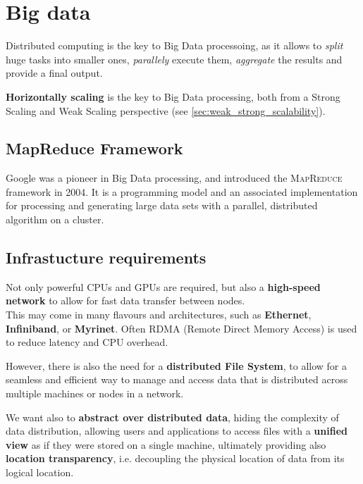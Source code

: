 \chapter{Big data}
\label{chap:big_data}

Distributed computing is the key to Big Data processoing, as it allows to \textit{split} huge tasks into smaller ones, \textit{parallely} execute them, \textit{aggregate} the results and provide a final output.

\textbf{Horizontally scaling} is the key to Big Data processing, both from a Strong Scaling and Weak Scaling perspective (see \autoref{sec:weak_strong_scalability}).

\section{MapReduce Framework}
Google was a pioneer in Big Data processing, and introduced the \textsc{MapReduce} framework in 2004.
It is a programming model and an associated implementation for processing and generating large data sets with a parallel, distributed algorithm on a cluster.



\section{Infrastucture requirements}

Not only powerful CPUs and GPUs are required, but also a \textbf{high-speed network} to allow for fast data transfer between nodes.\\
This may come in many flavours and architectures, such as \textbf{Ethernet}, \textbf{Infiniband}, or \textbf{Myrinet}. Often \textsc{RDMA} (Remote Direct Memory Access) is used to reduce latency and CPU overhead.

However, there is also the need for a \textbf{distributed File System}, to allow for a seamless and efficient way to manage and access data that is distributed across multiple machines or nodes in a network.

We want also to \textbf{abstract over distributed data}, hiding the complexity of data distribution, allowing users and applications to access files with a \textbf{unified view} as if they were stored on a single machine, ultimately providing also \textbf{location transparency}, i.e. decoupling the physical location of data from its logical location.

